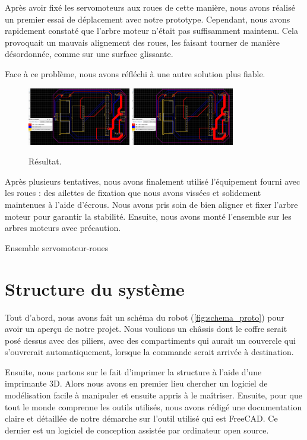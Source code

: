 \documentclass[a4paper,12pt]{report}  %
\begin{document}
Après avoir fixé les servomoteurs aux roues de cette manière, nous avons réalisé un premier essai de déplacement avec notre prototype. Cependant, nous avons rapidement constaté que l’arbre moteur n’était pas suffisamment maintenu. Cela provoquait un mauvais alignement des roues, les faisant tourner de manière désordonnée, comme sur une surface glissante.

Face à ce problème, nous avons réfléchi à une autre solution plus fiable.

\begin{figure}[H]
	\centering
	\includegraphics[width=0.4\textwidth]{./attachments/schema_pcb.jpg}
	\includegraphics[width=0.4\textwidth]{./attachments/schema_pcb.jpg}
	\caption{Résultat.}
\end{figure}

Après plusieurs tentatives, nous avons finalement utilisé l’équipement fourni avec les roues : des ailettes de fixation que nous avons vissées et solidement maintenues à l’aide d’écrous. Nous avons pris soin de bien aligner et fixer l’arbre moteur pour garantir la stabilité. Ensuite, nous avons monté l’ensemble sur les arbres moteurs avec précaution.

Ensemble servomoteur-roues

\section{Structure du système}

Tout d’abord, nous avons fait un schéma du robot (\autoref{fig:schema_proto}) pour avoir un aperçu de notre projet. Nous voulions un châssis dont le coffre serait posé dessus avec des piliers, avec des compartiments qui aurait un couvercle qui s'ouvrerait automatiquement, lorsque la commande serait arrivée à destination. 

Ensuite, nous partons sur le fait d’imprimer la structure à l’aide d’une imprimante 3D. Alors nous avons en premier lieu chercher un logiciel de modélisation facile à manipuler et ensuite appris à le maîtriser. Ensuite, pour que tout le monde comprenne les outils utilisés, nous avons rédigé une documentation claire et détaillée de notre démarche sur l'outil utilisé qui est FreeCAD. Ce dernier est un logiciel de conception assistée par ordinateur open source.
\end{document}
